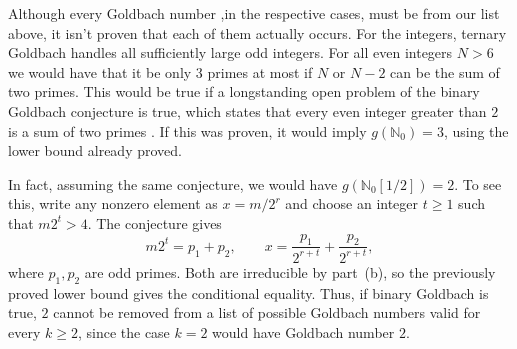\documentclass[11pt]{scrartcl}
\begin{document}
\begin{remark}
    Although every Goldbach number ,in the respective cases, must be from our list above, it isn't proven that each of them 
    actually occurs.
    For the integers, ternary Goldbach handles all sufficiently
    large odd integers. For all even integers $N>6$ we would 
    have that it be only $3$ primes at most if $N$ or $N-2$ can be the sum 
    of two primes. This would be true if a longstanding open problem 
    of the binary Goldbach conjecture is true, which states that every even
    integer greater than $2$ is a sum of two primes
    \cite[Section~1]{p7-shao-density}. If this was proven, it would imply
    $g(\mathbb N_0)=3$, using the lower bound already proved.


   In fact, assuming the same conjecture,
    we would have $g(\mathbb N_0[1/2])=2$.
    To see this, write any nonzero element as $x=m/2^r$ and
    choose an integer $t\ge1$ such that $m2^t>4$.
    The conjecture gives
    \[
        m2^t=p_1+p_2,
        \qquad
        x=\frac{p_1}{2^{r+t}}+\frac{p_2}{2^{r+t}},
    \]
    where $p_1,p_2$ are odd primes. Both are irreducible by part~(b), so the previously proved lower
    bound gives the conditional equality.
    Thus, if binary Goldbach is true, $2$ cannot be removed
from a list of possible Goldbach numbers valid for every
$k\ge2$, since the case $k=2$ would have Goldbach number $2$.
\end{remark}
\end{document}
